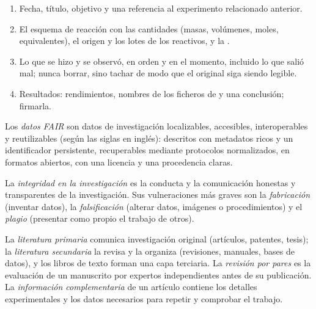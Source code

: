 \begin{method}\label{met:b3:lab-techniques-3:notebook}
\begin{enumerate}
  \item Fecha, título, objetivo y una referencia al experimento relacionado anterior.
  \item El esquema de reacción con las cantidades (masas, volúmenes, moles, equivalentes),
        el origen y los lotes de los reactivos, y la .
  \item Lo que se hizo y se observó, en orden y en el momento, incluido lo que salió
        mal; nunca borrar, sino tachar de modo que el original siga siendo legible.
  \item Resultados: rendimientos, nombres de los ficheros de  y una conclusión; firmarla.
\end{enumerate}
\end{method}

\begin{definition}\label{def:b3:lab-techniques-3:fair}
Los \emph{datos FAIR} son datos de investigación localizables,
accesibles, interoperables y reutilizables (según las siglas en inglés): descritos con metadatos ricos y un
identificador persistente, recuperables mediante protocolos normalizados, en formatos abiertos, con
una licencia y una procedencia claras.
\end{definition}

\begin{definition}\label{def:b3:lab-techniques-3:integrity}
La \emph{integridad en la investigación} es la conducta y la
comunicación honestas y transparentes de la investigación. Sus vulneraciones más graves son la
\emph{fabricación} (inventar datos), la \emph{falsificación}
(alterar datos, imágenes o procedimientos) y el \emph{plagio}
(presentar como propio el trabajo de otros).
\end{definition}

\begin{definition}[La bibliografía]\label{def:b3:lab-techniques-3:literature}
La \emph{literatura primaria} comunica investigación
original (artículos, patentes, tesis); la \emph{literatura
secundaria} la revisa y la organiza (revisiones,
manuales, bases de datos), y los libros de texto forman una capa terciaria. La \emph{revisión
por pares} es la evaluación de un manuscrito por expertos independientes
antes de su publicación. La \emph{información complementaria}
de un artículo contiene los detalles experimentales y los datos necesarios para
repetir y comprobar el trabajo.
\end{definition}

